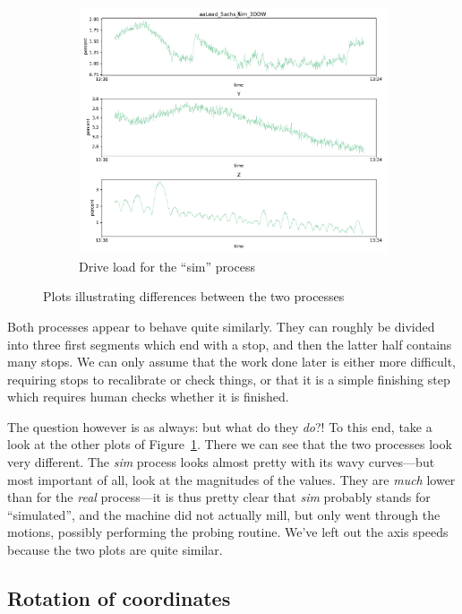 \documentclass[english]{scrartcl}
\begin{document}
\begin{figure}
\begin{subfigure}[t]{0.5\textwidth}
        \includegraphics[width=\textwidth]{sim_load.pdf}
        \caption{Drive load for the ``sim'' process}
    \end{subfigure}%

    \caption{Plots illustrating differences between the two processes}
    \label{fig:diff}
\end{figure}

Both processes appear to behave quite similarly. They can roughly be divided into three first
segments which end with a stop, and then the latter half contains many stops. We can only assume
that the work done later is either more difficult, requiring stops to recalibrate or check things,
or that it is a simple finishing step which requires human checks whether it is finished.

The question however is as always: but what do they \emph{do}?! To this end,
take a look at the other plots of Figure~\ref{fig:diff}. There we can see that the
two processes look very different. The \emph{sim} process looks almost pretty
with its wavy curves---but most important of all, look at the magnitudes of the
values. They are \emph{much} lower than for the \emph{real} process---it is
thus pretty clear that \emph{sim} probably stands for ``simulated'', and the
machine did not actually mill, but only went through the motions, possibly
performing the probing routine. We've left out the axis speeds because the two
plots are quite similar.

\subsection{Rotation of coordinates}
\end{document}
